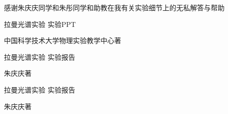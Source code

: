 \documentclass[hyperref]{ctexart}
\begin{document}
\begin{multicols}{2}
		
		感谢朱庆庆同学和朱彤同学和助教在我有关实验细节上的无私解答与帮助
		
		
		\begin{thebibliography}{100}%
			拉曼光谱实验 实验PPT
			
			
			中国科学技术大学物理实验教学中心\quad 著
			
			拉曼光谱实验 实验报告
			
			朱庆庆\quad 著
			
			拉曼光谱实验 实验报告
			
			朱庆庆\quad 著
			
		\end{thebibliography}
		
	\end{multicols}
\end{document}
